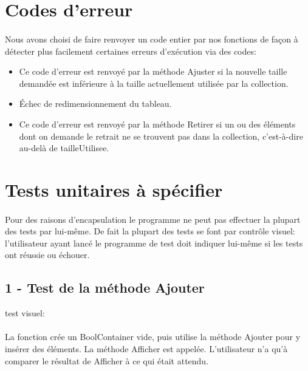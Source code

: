 \documentclass[a4paper, 12pts]{article}
\begin{document}
\section{Codes d'erreur}
\paragraph{}
Nous avons choisi de faire renvoyer un code entier par nos fonctions de façon à détecter plus facilement certaines erreurs d’exécution via des codes:
\begin{itemize}
	\item 
Ce code d’erreur est renvoyé par la méthode Ajuster si la nouvelle taille demandée est inférieure à la taille actuellement utilisée par la collection.
	\item 
Échec de redimensionnement du tableau.
	\item 
Ce code d’erreur est renvoyé par la méthode Retirer si un ou des éléments dont on demande le retrait ne se trouvent pas dans la collection, c’est-à-dire au-delà de tailleUtilisee.
\end{itemize}


\section{Tests unitaires à spécifier}

\paragraph{}
Pour des raisons d'encapsulation le programme ne peut pas effectuer la plupart des tests par lui-même. De fait la plupart des tests se font par contrôle visuel: l'utilisateur ayant lancé le programme de test doit indiquer lui-même si les tests ont réussie ou échouer.

\subsection{1 - Test de la méthode Ajouter}
test visuel:
\paragraph{}
La fonction crée un BoolContainer vide, puis utilise la méthode Ajouter pour y insérer des éléments. La méthode Afficher est appelée. L’utilisateur n’a qu’à comparer le résultat de Afficher à ce qui était attendu.
\end{document}
